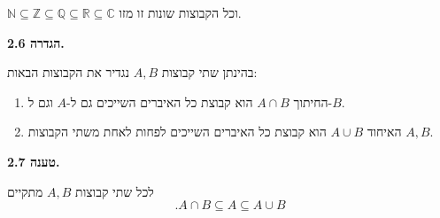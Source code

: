 \documentclass[12pt]{report}
\theoremstyle{plain}
\theoremstyle{definition}
\newcommand{\R}{\mathbb{R}}
\newcommand{\N}{\mathbb{N}}
\newcommand{\Z}{\mathbb{Z}}
\newcommand{\Q}{\mathbb{Q}}
\newcommand{\C}{\mathbb{C}}
\newcommand{\0}{\mathbf{0}}
\begin{document}
 
$\N\subseteq\Z\subseteq\Q\subseteq\R\subseteq\C$
וכל הקבוצות שונות זו מזו.
\bigskip
\bigskip

\noindent\textbf{הגדרה 2.6.}

בהינתן שתי קבוצות $A,B$ נגדיר את הקבוצות הבאות:

\begin{enumerate}[label=\alph*.]
\item החיתוך $A\cap B$ הוא קבוצת כל האיברים השייכים גם ל-$A$
וגם ל-$B$.

\item האיחוד $A\cup B$ הוא קבוצת כל האיברים השייכים לפחות לאחת משתי
הקבוצות $A,B$.
\end{enumerate}
\bigskip
\bigskip

\noindent\textbf{טענה 2.7.}

 
לכל שתי קבוצות $A,B$ מתקיים
$$
.A\cap B\subseteq A\subseteq A\cup B
$$
\bigskip
\bigskip
\end{document}
